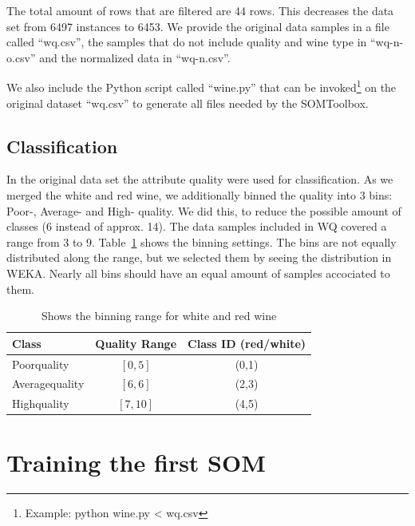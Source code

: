 \documentclass{acm_proc_article-sp}
\begin{document}
The total amount of rows that are filtered are 44 rows. This decreases the data set from 6497 instances to 6453.
We provide the original data samples in a file called ``wq.csv'', the samples that do not include quality and wine type
in ``wq-n-o.csv'' and the normalized data in ``wq-n.csv''.

We also include the Python script called ``wine.py'' that can be invoked\footnote{Example: python wine.py < wq.csv} on the original dataset ``wq.csv'' to generate all files needed by the SOMToolbox.

\subsection{Classification}

In the original data set the attribute quality were used for classification. As we merged the white and red wine,
we additionally binned the quality into 3 bins: Poor-, Average- and High- quality. We did this, to reduce the possible
amount of classes (6 instead of approx. 14).
The data samples included in WQ covered a range from 3 to 9. Table~\ref{tab:quality-binning} shows the binning settings.
The bins are not equally distributed along the range, but we selected them by seeing the distribution in WEKA. Nearly
all bins should have an equal amount of samples accociated to them.

\begin{table}
\centering
\begin{tabular}{l|c|c}
    Class & Quality Range & Class ID (red/white)\\
    \hline
    \hline
    Poorquality & $[0,5]$ & (0,1) \\
    \hline
    Averagequality & $[6,6]$ & (2,3) \\
    \hline
    Highquality & $[7,10]$ & (4,5) \\
    \hline
\end{tabular}
\caption{Shows the binning range for white and red wine}
\label{tab:quality-binning}
\end{table}

\section{Training the first SOM}
\end{document}
